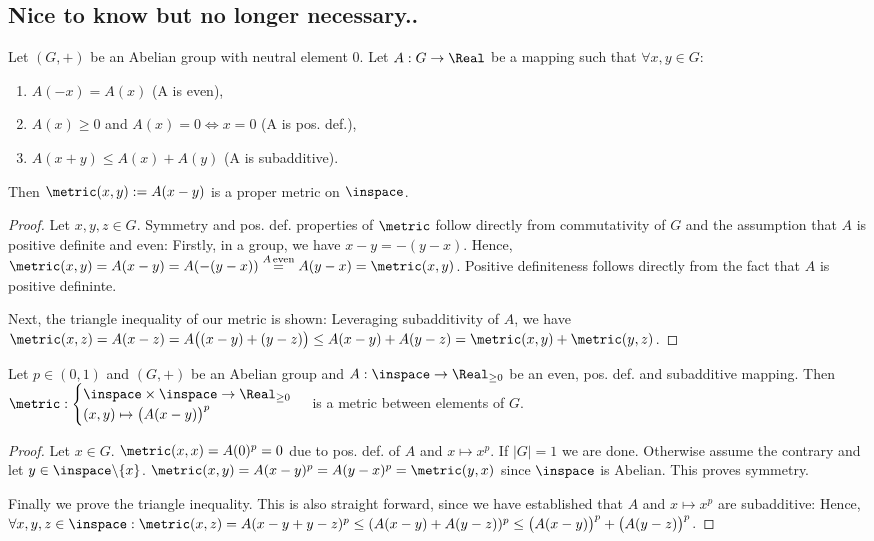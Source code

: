 \subsection{Nice to know but no longer necessary..}
\begin{lem}
Let $(G,+)$ be an Abelian group with neutral element $0$. Let $A: G \to \Real$ be a mapping such that 
$\forall x,y \in G: $
\begin{enumerate}
\item $A(-x) = A(x)$ (A is even),
	\item $A(x) \geq 0 $ and $A(x) = 0 \Leftrightarrow x =0$ (A is pos. def.),
	\item $ A(x+y) \leq A(x) + A(y)$ (A is subadditive). 
\end{enumerate}
Then $\metric (x,y) := A(x-y)$ is a proper metric on $\inspace$.
\begin{proof}
Let $x,y,z \in G$.
Symmetry and pos. def. properties of $\metric$ follow directly from commutativity of $G$ and the assumption that 
$A$ is positive definite and even: Firstly, in a group, we have $x-y = -(y-x)$. Hence, $\metric(x,y) = A(x-y) = A(-(y-x) ) \stackrel{A \, \text{even}}{=} A(y-x) = \metric(x,y)$. Positive definiteness follows directly from the fact that $A$ is positive defininte.

Next, the triangle inequality of our metric is shown: 
 Leveraging subadditivity of $A$,  we have 
$\metric(x,z) = A(x-z) = A\bigl((x-y) + (y-z)\bigr) \leq A(x-y)+A(y-z) = \metric(x,y) +\metric(y,z)$.
\end{proof}
\end{lem}

\begin{thm} \label{thm:subaddmetric1}
Let $p \in (0,1)$ and $(G,+)$ be an Abelian group and $A: \inspace \to \Real_{\geq 0}$ be an even, pos. def. and subadditive mapping. 
Then $\metric: \begin{cases} \inspace \times \inspace \to \Real_{\geq 0} \\ (x,y) \mapsto \bigl(A(x-y)\bigr)^p \end{cases}$ is a metric between elements of $G$.
\begin{proof} 
Let $x \in G$.
$\metric(x,x) = A(0)^p = 0$ due to pos. def. of $A$ and $x \mapsto x^p$.
If $|G| = 1$ we are done. Otherwise assume the contrary and let $y \in \inspace \backslash \{x\}$.
$\metric(x,y) = A(x-y)^p = A(y-x)^p = \metric(y,x)$ since $ \inspace $ is Abelian. This proves symmetry.

Finally we prove the triangle inequality. This is also straight forward, since we have established that $A$ and $x \mapsto x^p$
are subadditive:
Hence, 
$\forall x,y,z \in  \inspace : \metric(x,z) = A(x-y + y-z)^p \leq (A(x-y)  + A(y-z))^p \leq \bigl(A(x-y)\bigr)^p  + \bigl(A(y-z)\bigr)^p$.
\end{proof}
\end{thm}

